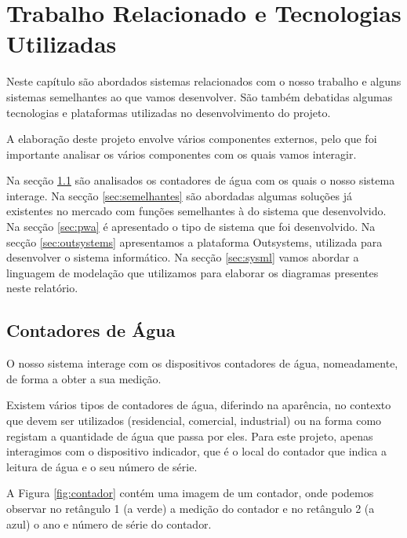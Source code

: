%
%
\chapter{Trabalho Relacionado e Tecnologias Utilizadas} \label{cap:trabrelacionado}
Neste capítulo são abordados sistemas relacionados com o nosso trabalho e alguns sistemas semelhantes ao que vamos desenvolver. São também debatidas algumas tecnologias e plataformas utilizadas no desenvolvimento do projeto.\par
A elaboração deste projeto envolve vários componentes externos, pelo que foi importante analisar os vários componentes com os quais vamos interagir.\par
Na secção \ref{sec:cont} são analisados os contadores de água com os quais o nosso sistema interage. Na secção \ref{sec:semelhantes} são abordadas algumas soluções já existentes no mercado com funções semelhantes à do sistema que desenvolvido. Na secção \ref{sec:pwa} é apresentado o tipo de sistema que foi desenvolvido. Na secção \ref{sec:outsystems} apresentamos a plataforma Outsystems, utilizada para desenvolver o sistema informático. Na secção \ref{sec:sysml} vamos abordar a linguagem de modelação que utilizamos para elaborar os diagramas presentes neste relatório.


\section{Contadores de Água} \label{sec:cont}
O nosso sistema interage com os dispositivos contadores de água, nomeadamente, de forma a obter a sua medição.\par
Existem vários tipos de contadores de água, diferindo na aparência, no contexto que devem ser utilizados (residencial, comercial, industrial) ou na forma como registam a quantidade de água que passa por eles. Para este projeto, apenas interagimos com o dispositivo indicador, que é o local do contador que indica a leitura de água e o seu número de série.\par
A Figura \ref{fig:contador} contém uma imagem de um contador, onde podemos observar no retângulo 1 (a verde) a medição do contador e no retângulo 2 (a azul) o ano e número de série do contador.

